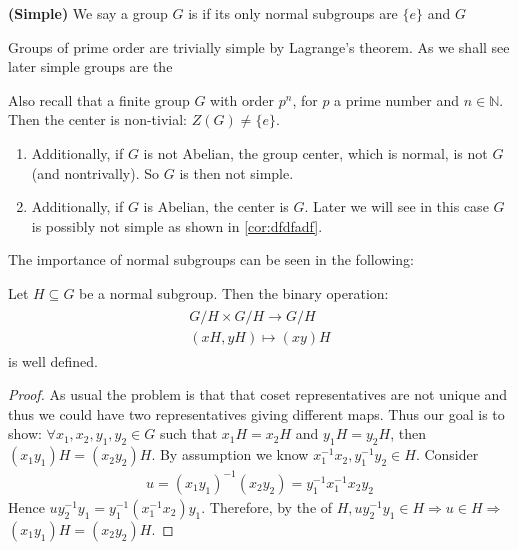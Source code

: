 \documentclass{article}
\newcommand{\bfs}[1]{\textbf{({#1}) }}
\begin{document}
\begin{defa}{\bfs{Simple}}\label{def:simple}
 We say a group $G$ is  if its only normal subgroups are
$\{e\}$ and $G$
\end{defa} 
\begin{exma}
Groups of prime order are trivially simple by Lagrange's theorem. As we shall see later simple groups are the 
\end{exma}
\begin{rema}
Also recall that  a finite group  $G$ with order $p^{n}$, for $p$ a prime number and $n \in \mathbb{N}$. Then the center is non-tivial: $Z(G)\ne\{e\}$.
\begin{enumerate}
    \item Additionally, if $G$ is not Abelian, the group center, which is normal, is not $G$ (and nontrivally). So $G$ is then not simple.  \item Additionally, if $G$ is Abelian, the center is $G$. Later we will see in this case $G$ is possibly not simple as shown in \cref{cor:dfdfadf}.
\end{enumerate}
\end{rema}
The importance of normal subgroups can be seen in the following:
\begin{lema}
Let $H \subseteq G$ be a normal subgroup. Then the binary operation:
\begin{align*}
\begin{gathered}
G / H \times G / H \rightarrow G / H \\
(x H, y H) \mapsto(x y) H
\end{gathered}
\end{align*}
is well defined.
\end{lema}
\begin{proof}
As usual the problem is that that coset representatives are not unique and thus we could have two representatives giving different maps. Thus our goal is to show:
$\forall x_{1}, x_{2}, y_{1}, y_{2} \in G$ such that $x_{1} H=x_{2} H$ and $y_{1} H=y_{2} H$, then $\left(x_{1} y_{1}\right) H=\left(x_{2} y_{2}\right) H$.
By assumption we know $x_{1}^{-1} x_{2}, y_{1}^{-1} y_{2} \in H .$ Consider
\begin{align*}
u=\left(x_{1} y_{1}\right)^{-1}\left(x_{2} y_{2}\right)=y_{1}^{-1} x_{1}^{-1} x_{2} y_{2}
\end{align*}
Hence $u y_{2}^{-1} y_{1}=y_{1}^{-1}\left(x_{1}^{-1} x_{2}\right) y_{1} .$ Therefore, by the  of $H, u y_{2}^{-1} y_{1} \in H \Rightarrow u \in H \Rightarrow$
$\left(x_{1} y_{1}\right) H=\left(x_{2} y_{2}\right) H$.
\end{proof} 
\end{document}
